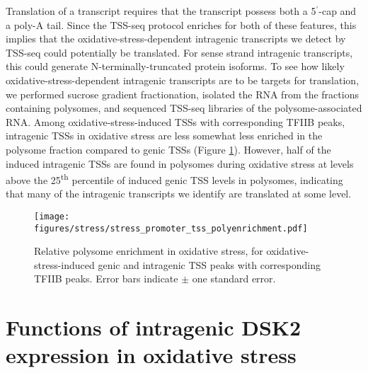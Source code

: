Translation of a transcript requires that the transcript possess both a 5$^\prime$-cap and a poly-A tail.
Since the TSS-seq protocol enriches for both of these features, this implies that the oxidative-stress-dependent intragenic transcripts we detect by TSS-seq could potentially be translated.
For sense strand intragenic transcripts, this could generate N-terminally-truncated protein isoforms.
To see how likely oxidative-stress-dependent intragenic transcripts are to be targets for translation, we performed sucrose gradient fractionation, isolated the RNA from the fractions containing polysomes, and sequenced TSS-seq libraries of the polysome-associated RNA.
Among oxidative-stress-induced TSSs with corresponding TFIIB peaks, intragenic TSSs in oxidative stress are less somewhat less enriched in the polysome fraction compared to genic TSSs (Figure \ref{fig:stress_promoter_tss_polyenrichment}).
However, half of the induced intragenic TSSs are found in polysomes during oxidative stress at levels above the 25\textsuperscript{th} percentile of induced genic TSS levels in polysomes, indicating that many of the intragenic transcripts we identify are translated at some level.

\begin{figure}[h]
    \texttt{[image: figures/stress/stress\_promoter\_tss\_polyenrichment.pdf]}
    \caption[Relative polysome enrichment in oxidative stress, for oxidative-stress-induced genic and intragenic promoters.]{Relative polysome enrichment in oxidative stress, for oxidative-stress-induced genic and intragenic TSS peaks with corresponding TFIIB peaks. Error bars indicate $\pm$ one standard error.}
    \label{fig:stress_promoter_tss_polyenrichment}
\end{figure}

\section{Functions of intragenic DSK2 expression in oxidative stress}

